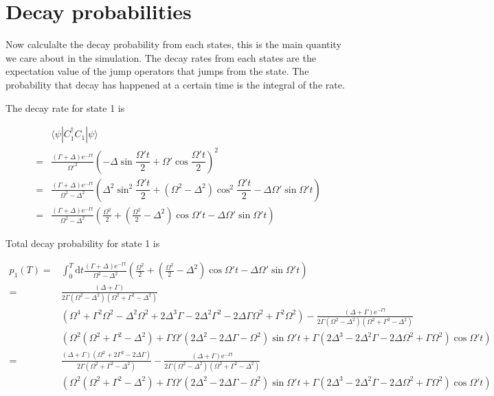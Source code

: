 \documentclass[10pt,fleqn]{article}
\newcommand{\ud}{\mathrm{d}}
\newcommand{\ue}{\mathrm{e}}
\newcommand{\eqar}[1]
{
  \begin{align*}
    #1
  \end{align*}
}
\newcommand{\paren}[1]{{\left({#1}\right)}}
\begin{document}
\section{Decay probabilities}
Now calculalte the decay probability from each states,
this is the main quantity we care about in the simulation.
The decay rates from each states are the expectation value of the jump operators
that jumps from the state.
The probability that decay has happened at a certain time is the integral of the rate.

The decay rate for state 1 is
\eqar{
  &\langle\psi|C_1^\dagger C_1|\psi\rangle\\
  =&\frac{\paren{\Gamma+\Delta}\ue^{-\Gamma t}}{\Omega'^2}\paren{-\Delta\sin\dfrac{\Omega't}{2}+\Omega'\cos\dfrac{\Omega't}{2}}^2\\
  =&\frac{\paren{\Gamma+\Delta}\ue^{-\Gamma t}}{\Omega^2-\Delta^2}\paren{
    \Delta^2\sin^2\dfrac{\Omega't}{2}+\paren{\Omega^2-\Delta^2}\cos^2\dfrac{\Omega't}{2}
    -\Delta\Omega'\sin\Omega't
  }\\
  =&\frac{\paren{\Gamma+\Delta}\ue^{-\Gamma t}}{\Omega^2-\Delta^2}\paren{
    \frac{\Omega^2}2+\paren{\frac{\Omega^2}2-\Delta^2}\cos\Omega't-\Delta\Omega'\sin\Omega't
  }
}
Total decay probability for state 1 is
\eqar{
  p_1(T)=&\int_0^T\ud t\frac{\paren{\Gamma+\Delta}\ue^{-\Gamma t}}{\Omega^2-\Delta^2}\paren{
    \frac{\Omega^2}2+\paren{\frac{\Omega^2}2-\Delta^2}\cos\Omega't-\Delta\Omega'\sin\Omega't
  }\\
  =&\frac{\paren{\Delta+\Gamma}}{2\Gamma\paren{\Omega^2-\Delta^2}\paren{\Omega^2+\Gamma^2-\Delta^2}}\\
  &\paren{\Omega^4+\Gamma^2\Omega^2-\Delta^2\Omega^2+2\Delta^3\Gamma-2\Delta^2\Gamma^2-2\Delta\Gamma\Omega^2+\Gamma^2\Omega^2}-\frac{\paren{\Delta+\Gamma}\ue^{-\Gamma t}}{2\Gamma\paren{\Omega^2-\Delta^2}\paren{\Omega^2+\Gamma^2-\Delta^2}}\\
  &\paren{\Omega^2\paren{\Omega^2+\Gamma^2-\Delta^2}+\Gamma\Omega'\paren{2\Delta^2-2\Delta\Gamma-\Omega^2}\sin\Omega't+\Gamma\paren{2\Delta^3-2\Delta^2\Gamma-2\Delta\Omega^2+\Gamma\Omega^2}\cos\Omega't}\\
  =&\frac{\paren{\Delta+\Gamma}\paren{\Omega^2+2\Gamma^2-2\Delta\Gamma}}{2\Gamma\paren{\Omega^2+\Gamma^2-\Delta^2}}-\frac{\paren{\Delta+\Gamma}\ue^{-\Gamma t}}{2\Gamma\paren{\Omega^2-\Delta^2}\paren{\Omega^2+\Gamma^2-\Delta^2}}\\
  &\paren{\Omega^2\paren{\Omega^2+\Gamma^2-\Delta^2}+\Gamma\Omega'\paren{2\Delta^2-2\Delta\Gamma-\Omega^2}\sin\Omega't+\Gamma\paren{2\Delta^3-2\Delta^2\Gamma-2\Delta\Omega^2+\Gamma\Omega^2}\cos\Omega't}
}
\end{document}
